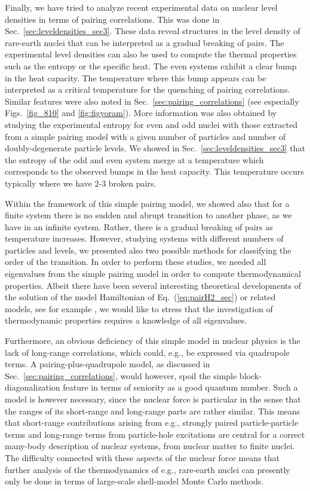 \documentclass[rmp,preprint,aps,floatfix]{revtex4}
\begin{document}
Finally, we have tried to analyze recent experimental data on nuclear level
densities in terms of pairing correlations. This was done in 
Sec.~\ref{sec:leveldensities_sec3}. These data reveal structures in the level
density of rare-earth nuclei that can be interpreted as a gradual breaking
of pairs. The experimental level densities can also be used to compute the 
thermal properties such as the entropy or the specific heat.
The even systems exhibit a clear bump in the heat capacity. The temperature
where this bump appears can be interpreted as a critical temperature 
for the quenching of pairing correlations. Similar features were also noted in
Sec.~\ref{sec:pairing_correlations} (see especially Figs.~\ref{fig_810} and 
\ref{fig:figyoram}).
More information was also obtained by studying the 
experimental entropy for even and odd nuclei with those
extracted from a simple pairing model with a given number of particles 
and number of doubly-degenerate particle levels. We showed in 
Sec.~\ref{sec:leveldensities_sec3} that the entropy of the odd and even system
merge at a temperature which corresponds to the observed bumps in the 
heat capacity. This temperature occurs typically where we have 2-3 
broken pairs.

Within the framework of this simple pairing model, we 
showed also that for a finite system there is no sudden and abrupt transition
to another phase, as we have in an infinite system. Rather, there is a
gradual breaking of pairs as temperature increases. However, studying
systems with different numbers of particles and levels, we 
presented also two 
possible methods for classifying the order of the transition. 
In order to perform these studies, we needed all eigenvalues
from the simple pairing model in order to compute thermodynamical
properties. 
Albeit there have been several interesting theoretical developments
of the solution of the model Hamiltonian of Eq.~(\ref{eq:pairH2_sec})
or related models,
see for example 
\cite{richardson2002,dukelsky2002,volya_1,volya_3}, we would like to 
stress that the investigation of thermodynamic properties requires a
knowledge of all eigenvalues. 

Furthermore, an obvious deficiency of this simple model in nuclear physics
is the lack of long-range correlations, which could, e.g., 
be expressed via quadrupole terms. A pairing-plus-quadrupole model,
as discussed in  Sec.~\ref{sec:pairing_correlations}, would however, spoil
the simple block-diagonalization feature in terms of seniority as a good 
quantum number. Such a model is however necessary, since the nuclear force
is particular in the sense that the ranges of its short-range and long-range
parts are rather similar. This means that short-range contributions arising
from e.g., strongly paired particle-particle terms and 
long-range terms from particle-hole excitations  
are central for a correct many-body
description of nuclear systems, from nuclear matter to finite nuclei. 
The difficulty connected with these aspects of the nuclear force means
that further 
analysis of the thermodynamics of e.g.,
rare-earth nuclei can presently only be done  
in terms of large-scale shell-model Monte Carlo methods.
\end{document}
